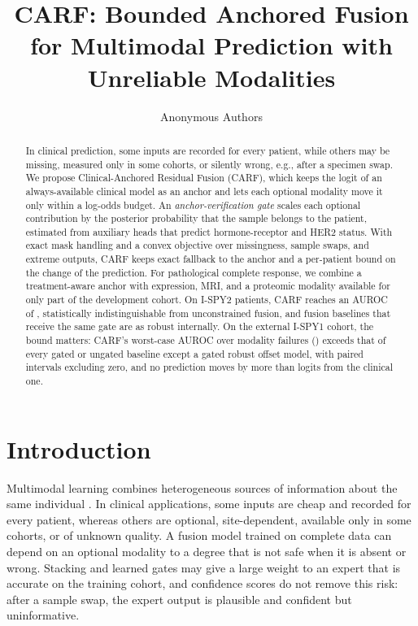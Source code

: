 \documentclass[a4paper,runningheads]{llncs}
\begin{document}
\title{CARF: Bounded Anchored Fusion for Multimodal Prediction with Unreliable Modalities}
\author{Anonymous Authors}
\maketitle

\begin{abstract}
In clinical prediction, some inputs are recorded for every patient, while others may be missing, measured only in some cohorts, or silently wrong, e.g., after a specimen swap. We propose Clinical-Anchored Residual Fusion (CARF), which keeps the logit of an always-available clinical model as an anchor and lets each optional modality move it only within a log-odds budget. An \emph{anchor-verification gate} scales each optional contribution by the posterior probability that the sample belongs to the patient, estimated from auxiliary heads that predict hormone-receptor and HER2 status. With exact mask handling and a convex objective over missingness, sample swaps, and extreme outputs, CARF keeps exact fallback to the anchor and a per-patient bound on the change of the prediction. For pathological complete response, we combine a treatment-aware anchor with expression, MRI, and a proteomic modality available for only part of the development cohort. On \NDev{} I-SPY2 patients, CARF reaches an AUROC of \IntCarfTwo{}, statistically indistinguishable from unconstrained fusion, and fusion baselines that receive the same gate are as robust internally. On the external I-SPY1 cohort, the bound matters: CARF's worst-case AUROC over modality failures (\ExtWorstCarfTwo{}) exceeds that of every gated or ungated baseline except a gated robust offset model, with paired intervals excluding zero, and no prediction moves by more than \MaxDispCarfTwo{} logits from the clinical one.
\end{abstract}

\section{Introduction}

Multimodal learning combines heterogeneous sources of information about the same individual \cite{baltrusaitis2019}. In clinical applications, some inputs are cheap and recorded for every patient, whereas others are optional, site-dependent, available only in some cohorts, or of unknown quality. A fusion model trained on complete data can depend on an optional modality to a degree that is not safe when it is absent or wrong. Stacking \cite{wolpert1992} and learned gates may give a large weight to an expert that is accurate on the training cohort, and confidence scores do not remove this risk: after a sample swap, the expert output is plausible and confident but uninformative.
\end{document}
